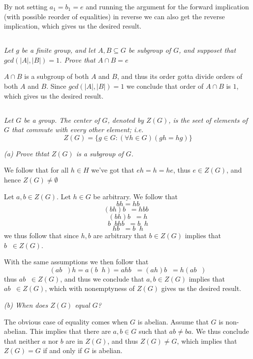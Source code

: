 \documentclass[11pt,oneside,titlepage]{book}
\DeclareMathOperator \inv {^{-1}}
\newcommand{\set}[1]{\{ #1 \}}
\begin{document}
By not setting $a_1 = b_1 = e$ and running the argument for the
forward implication (with possible reorder of equalities) in reverse
we can also get the reverse implication, which gives us the desired
result.

\subsection{}

\textit{Let $g$ be a finite group, and let $A, B \subseteq G$ be
subgroup of $G$, and supposet that $gcd(|A|, |B|) = 1$. Prove that $A
\cap B = e$}

$A \cap B$ is a subgroup of both $A$ and $B$, and thus its order gotta
divide orders of both $A$ and $B$. Since $gcd(|A|, |B|) = 1$ we
conclude that order of $A \cap B$ is $1$, which gives us the desired
result.

\subsection{}

\textit{Let $G$ be a group. The center of $G$, denoted by $Z(G)$, is
the seet of elements of $G$ that commute with every other element;
i.e.
$$Z(G) = \set{g \in G: (\forall h \in G)(gh = hg) }$$}

\textit{(a) Prove thtat $Z(G)$ is a subgroup of $G$.}

We follow that for all $h \in H$ we've got that $eh = h = he$, thus
$e \in Z(G)$, and hence $Z(G) \neq \emptyset$

Let $a, b \in Z(G)$. Let $h \in G$ be arbitrary. We follow that
$$bh = hb$$
$$(bh)b\inv = h b b\inv$$
$$(bh)b\inv = h$$
$$b\inv b h b\inv = b\inv h$$
$$h b\inv = b\inv h$$
we thus follow that since $h, b$ are arbitrary that $b \in Z(G)$
implies that $b\inv \in Z(G)$.

With the same assumptions we then follow that
$$(a b\inv) h = a (b\inv h) = a h b\inv = (a h) b\inv = h (a b\inv)$$
thus $a b\inv \in Z(G)$, and thus we conclude that $a, b \in Z(G)$
implies that $ab\inv \in Z(G)$, which with nonemptyness of $Z(G)$
gives us the desired result.

\textit{(b) When does $Z(G)$ equal $G$?}

The obvious case of equality comes when $G$ is abelian. Assume that
$G$ is non-abelian. This implies that there are $a, b \in G$ such that
$ab \neq b a $. We thus conclude that neither $a$ nor $b$ are in
$Z(G)$, and thus $Z(G) \neq G$, which implies that $Z(G) = G$ if and
only if $G$ is abelian.
\end{document}
